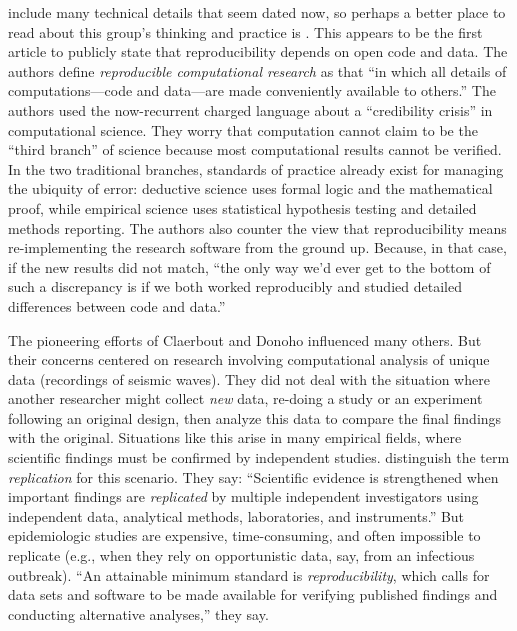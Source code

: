 \documentclass{statement}
\newlength{\up}
\begin{document}
\cite{buckheit_donoho1995} include many technical details that seem dated now, so perhaps a better place to read about this group's thinking and practice is \cite{donohoETal2009}. 
This appears to be the first article to publicly state that reproducibility depends on open code and data. The authors define \emph{reproducible computational research} as that ``in which all details of computations---code and data---are made conveniently available to others.'' 
The authors used the now-recurrent charged language about a ``credibility crisis'' in computational science.
They worry that computation cannot claim to be the ``third branch'' of science because most computational results cannot be verified. 
In the two traditional branches, standards of practice already exist for managing the ubiquity of error: deductive science uses formal logic and the mathematical proof, while empirical science uses statistical hypothesis testing and detailed methods reporting. 
The authors also counter the view that reproducibility means re-implementing the research software from the ground up. 
Because, in that case, if the new results did not match, ``the only way we'd ever get to the bottom of such a discrepancy is if we both worked reproducibly and studied detailed differences between code and data.''

The pioneering efforts of Claerbout and Donoho influenced many others. But their concerns centered on research involving computational analysis of unique data (recordings of seismic waves). 
They did not deal with the situation where another researcher might collect \emph{new} data, re-doing a study or an experiment following an original design, then analyze this data to compare the final findings with the original. 
Situations like this arise in many empirical fields, where scientific findings must be confirmed by independent studies. 
\cite{pengETal2006} distinguish the term \emph{replication} for this scenario. They say:
``Scientific evidence is strengthened when important findings are \emph{replicated} by multiple independent investigators using independent data, analytical methods, laboratories, and instruments.'' 
But epidemiologic studies are expensive, time-consuming, and often impossible to replicate (e.g., when they rely on opportunistic data, say, from an infectious outbreak). 
``An attainable minimum standard is \emph{reproducibility}, which calls for data sets and software to be made available for verifying published findings and conducting alternative analyses,'' they say.
\end{document}
